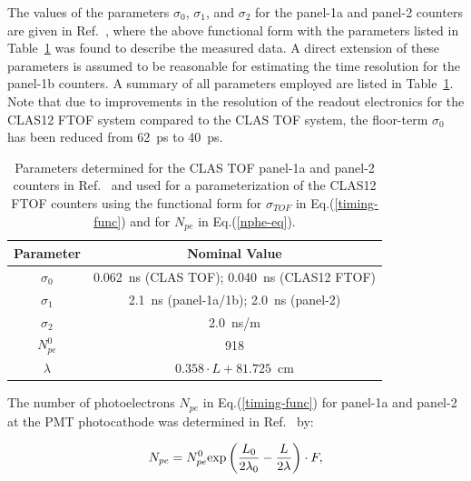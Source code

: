 \documentclass[3p,times,twocolumn]{elsarticle}
\begin{document}
The values of the parameters $\sigma_0$, $\sigma_1$, and $\sigma_2$ for the panel-1a and panel-2
counters are given in Ref.~\cite{tof-nim}, where the above functional form with the parameters listed
in Table~\ref{timing-parms} was found to describe the measured data. A direct extension of these
parameters is assumed to be reasonable for estimating the time resolution for the panel-1b counters.
A summary of all parameters employed are listed in Table~\ref{timing-parms}. Note that due to
improvements in the resolution of the readout electronics for the CLAS12 FTOF system compared to
the CLAS TOF system, the floor-term $\sigma_0$ has been reduced from 62~ps to 40~ps. 

\begin{table}[htbp]
\begin{center}
\begin{tabular} {c|c} \hline
Parameter    & Nominal Value\\ \hline
$\sigma_0$ & 0.062~ns (CLAS TOF); 0.040~ns (CLAS12 FTOF) \\ 
$\sigma_1$  & 2.1~ns (panel-1a/1b); 2.0~ns (panel-2) \\ 
$\sigma_2$  & 2.0~ns/m \\ 
$N_{pe}^0$   & 918 \\
$\lambda$   & $0.358\cdot L + 81.725$~cm \\ \hline
\end{tabular}
\caption{Parameters determined for the CLAS TOF panel-1a and panel-2 counters in Ref.~\cite{tof-nim}
and used for a parameterization of the CLAS12 FTOF counters using the functional form for $\sigma_{TOF}$
in Eq.(\ref{timing-func}) and for $N_{pe}$ in Eq.(\ref{nphe-eq}).}
\label{timing-parms}
\end{center}
\end{table}

The number of photoelectrons $N_{pe}$ in Eq.(\ref{timing-func}) for panel-1a and panel-2 at the PMT
photocathode was determined in Ref.~\cite{tof-nim} by:

\begin{equation}
\label{nphe-eq}
N_{pe} = N_{pe}^0 {\rm exp} \left( \frac{L_0}{2 \lambda_0} - \frac{L}{2 \lambda} \right) \cdot F,
\end{equation}
\end{document}
